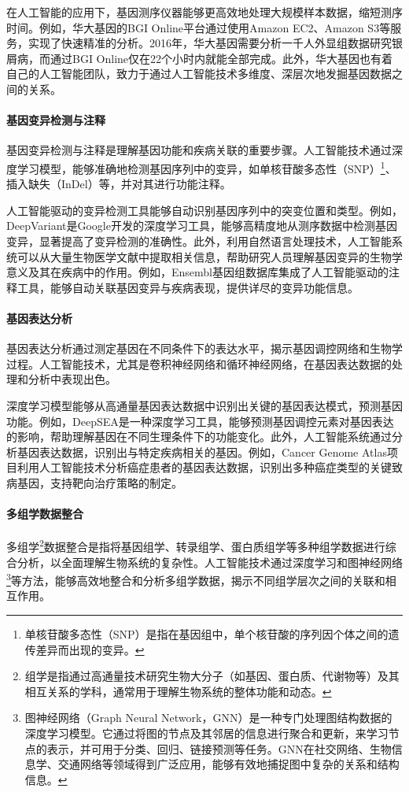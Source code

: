 在人工智能的应用下，基因测序仪器能够更高效地处理大规模样本数据，缩短测序时间。例如，华大基因的BGI Online平台通过使用Amazon EC2、Amazon S3等服务，实现了快速精准的分析。2016年，华大基因需要分析一千人外显组数据研究银屑病，而通过BGI Online仅在22个小时内就能全部完成。此外，华大基因也有着自己的人工智能团队，致力于通过人工智能技术多维度、深层次地发掘基因数据之间的关系。

\paragraph{基因变异检测与注释}

基因变异检测与注释是理解基因功能和疾病关联的重要步骤。人工智能技术通过深度学习模型，能够准确地检测基因序列中的变异，如单核苷酸多态性（SNP）\footnote{单核苷酸多态性（SNP）是指在基因组中，单个核苷酸的序列因个体之间的遗传差异而出现的变异。}、插入缺失（InDel）等，并对其进行功能注释。

人工智能驱动的变异检测工具能够自动识别基因序列中的突变位置和类型。例如，DeepVariant是Google开发的深度学习工具，能够高精度地从测序数据中检测基因变异，显著提高了变异检测的准确性。此外，利用自然语言处理技术，人工智能系统可以从大量生物医学文献中提取相关信息，帮助研究人员理解基因变异的生物学意义及其在疾病中的作用。例如，Ensembl基因组数据库集成了人工智能驱动的注释工具，能够自动关联基因变异与疾病表现，提供详尽的变异功能信息。

\paragraph{基因表达分析}

基因表达分析通过测定基因在不同条件下的表达水平，揭示基因调控网络和生物学过程。人工智能技术，尤其是卷积神经网络和循环神经网络，在基因表达数据的处理和分析中表现出色。

深度学习模型能够从高通量基因表达数据中识别出关键的基因表达模式，预测基因功能。例如，DeepSEA是一种深度学习工具，能够预测基因调控元素对基因表达的影响，帮助理解基因在不同生理条件下的功能变化。此外，人工智能系统通过分析基因表达数据，识别出与特定疾病相关的基因。例如，Cancer Genome Atlas项目利用人工智能技术分析癌症患者的基因表达数据，识别出多种癌症类型的关键致病基因，支持靶向治疗策略的制定。

\paragraph{多组学数据整合}

多组学\footnote{组学是指通过高通量技术研究生物大分子（如基因、蛋白质、代谢物等）及其相互关系的学科，通常用于理解生物系统的整体功能和动态。}数据整合是指将基因组学、转录组学、蛋白质组学等多种组学数据进行综合分析，以全面理解生物系统的复杂性。人工智能技术通过深度学习和图神经网络\footnote{图神经网络（Graph Neural Network，GNN）是一种专门处理图结构数据的深度学习模型。它通过将图的节点及其邻居的信息进行聚合和更新，来学习节点的表示，并可用于分类、回归、链接预测等任务。GNN在社交网络、生物信息学、交通网络等领域得到广泛应用，能够有效地捕捉图中复杂的关系和结构信息。}等方法，能够高效地整合和分析多组学数据，揭示不同组学层次之间的关联和相互作用。

